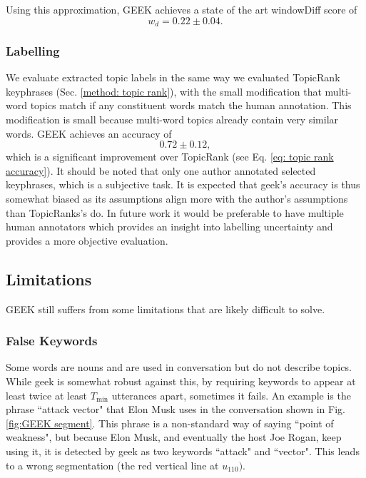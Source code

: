        Using this approximation, GEEK achieves a state of the art windowDiff score of
        \begin{equation}
            w_d = 0.22 \pm 0.04.
        \end{equation}


    \subsubsection{Labelling}
        We evaluate extracted topic labels in the same way we evaluated TopicRank \glspl{keyphrase} (Sec. \ref{method: topic rank}), with the small modification that multi-word topics match if any constituent words match the human annotation. This modification is small because multi-word topics already contain very similar words. GEEK achieves an accuracy of
        \begin{equation}
            0.72 \pm 0.12,
        \end{equation}
        which is a significant improvement over TopicRank (see Eq. \ref{eq: topic rank accuracy}). It should be noted that only one author annotated selected \glspl{keyphrase}, which is a subjective task. It is expected that \gls{geek}'s accuracy is thus somewhat biased as its assumptions align more with the author's assumptions than TopicRanks's do. In future work it would be preferable to have multiple human annotators which provides an insight into labelling uncertainty and provides a more objective evaluation.

    \subsection{Limitations}
    GEEK still suffers from some limitations that are likely difficult to solve.

    \subsubsection{False Keywords}
        Some words are nouns and are used in conversation but do not describe topics. While \gls{geek} is somewhat robust against this, by requiring keywords to appear at least twice at least $T_{\text{min}}$ \glspl{utterance} apart, sometimes it fails. An example is the phrase ``attack vector" that Elon Musk uses in the conversation shown in Fig. \ref{fig:GEEK segment}. This phrase is a non-standard way of saying ``point of weakness", but because Elon Musk, and eventually the host Joe Rogan, keep using it, it is detected by \gls{geek} as two keywords ``attack" and ``vector". This leads to a wrong segmentation (the red vertical line at $u_{110})$.

